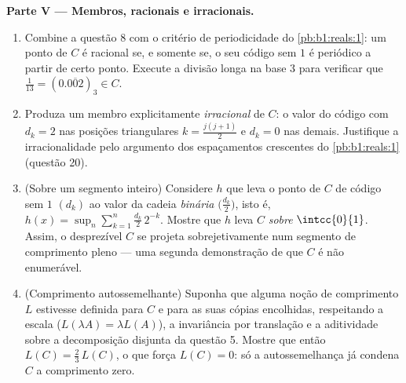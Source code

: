 \begin{problem}[{Problema de fim de semana --- o \omterm{pb:b1:topology:1}{conjunto de Cantor}
dos terços médios: comprimento zero, não enumerável, perfeito e $C + C =
\intcc{0}{2}$}]
\medskip
\noindent\textbf{Parte V --- Membros, racionais e irracionais.}
\begin{enumerate}
  \item Combine a questão 8 com o critério de periodicidade do
        \cref{pb:b1:reals:1}: um ponto de $C$ é racional se, e somente
        se, o seu código sem $1$ é periódico a partir de certo ponto.
        Execute a divisão longa na base $3$ para verificar que $\frac1{13} =
        (0.\overline{002})_3 \in C$.
  \item Produza um membro explicitamente \emph{irracional} de $C$:
        o valor do código com $d_k = 2$ nas posições triangulares
        $k = \frac{j(j+1)}{2}$ e $d_k = 0$ nas demais. Justifique a
        irracionalidade pelo argumento dos espaçamentos crescentes do
        \cref{pb:b1:reals:1} (questão 20).
  \item (Sobre um segmento inteiro) Considere $h$ que leva o ponto de
        $C$ de código sem $1$ $(d_k)$ ao valor da cadeia
        \emph{binária} $\bigl(\frac{d_k}2\bigr)$, isto é,
        $h(x) = \sup_n \sum_{k=1}^n \frac{d_k}{2}\,2^{-k}$.
        Mostre que $h$ leva $C$ \emph{sobre} $\intcc{0}{1}$. Assim,
        o desprezível $C$ se projeta sobrejetivamente num segmento de
        comprimento pleno --- uma segunda demonstração de que $C$ é
        não enumerável.
  \item (Comprimento autossemelhante) Suponha que alguma noção de
        comprimento $L$ estivesse definida para $C$ e para as suas
        cópias encolhidas, respeitando a escala ($L(\lambda A) = \lambda L(A)$), a
        invariância por translação e a aditividade sobre a decomposição
        disjunta da questão 5. Mostre que então $L(C) = \frac23\,L(C)$,
        o que força $L(C) = 0$: só a autossemelhança já
        condena $C$ a comprimento zero.
\end{enumerate}


\end{problem}

